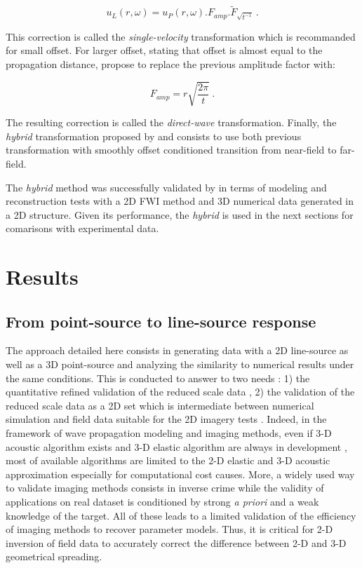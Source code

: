 \documentclass[manuscript,revised]{geophysics}
\newcommand{\twod}{2-D }
\newcommand{\thrd}{3-D }
\begin{document}
\begin{equation}
	u_{L}(r,\omega)=u_{P}(r,\omega).F_{amp}.\widetilde{F}_{\sqrt{t^{-1}}}\ .
	\label{eq:single-velocity}
\end{equation}

\noindent This correction is called the \textit{single-velocity} transformation which is recommanded for small offset. For larger offset, stating that offset is almost equal to the propagation distance, \citet{Schafer_LSS_2014} propose to replace the previous amplitude factor with:

\begin{equation}
\label{eq:direct-wave}
F_{amp}=r\sqrt{\frac{2 \pi}{t}}\ .
\end{equation}

\noindent The resulting correction is called the \textit{direct-wave} transformation. Finally, the \textit{hybrid} transformation proposed by \citet{Forbriger_LSS_2014} and \citet{Schafer_LSS_2014} consists to use both previous transformation with smoothly offset conditioned transition from near-field to far-field.

\noindent The \textit{hybrid} method was successfully validated by \citet{Schafer_LSS_2014} in terms of modeling and reconstruction tests with a 2D FWI method and 3D numerical data generated in a 2D structure. Given its performance, the \textit{hybrid} is used in the next sections for comarisons with experimental data. 

\section{Results}

\subsection{From point-source to line-source response}

\noindent The approach detailed here consists in generating data with a 2D line-source as well as a 3D point-source and analyzing the similarity to numerical results under the same conditions. This is conducted to answer to two needs : 1) the quantitative refined validation of the reduced scale data , 2) the validation of the reduced scale data as a 2D set which is intermediate between numerical simulation and field data suitable for the 2D imagery tests . Indeed, in the framework of wave propagation modeling and imaging methods, even if \thrd acoustic algorithm exists \citep{benhadjali_FWI_2008,plessix_FWI_2010} and \thrd elastic algorithm are always in development \citep{castellanos_AMD_2011,Borisov_FWI_2015}, most of available algorithms are limited to the \twod elastic and \thrd acoustic approximation especially for computational cost causes. More, a widely used way to validate imaging methods consists in inverse crime while the validity of applications on real dataset is conditioned by strong \textit{a priori} and a weak knowledge of the target. All of these leads to a limited validation of the efficiency of imaging methods to recover parameter models. Thus, it is critical for \twod inversion of field data to accurately correct the difference between \twod and \thrd geometrical spreading.
\end{document}
